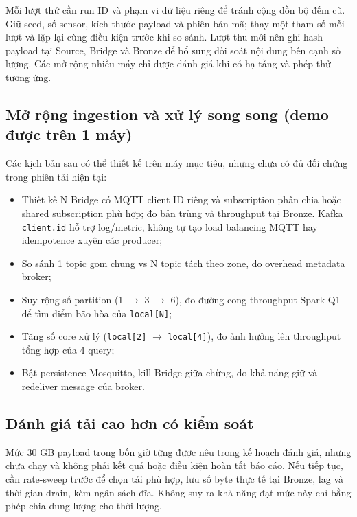 Mỗi lượt thử cần run ID và phạm vi dữ liệu riêng để tránh cộng dồn bộ
đếm cũ. Giữ seed, số sensor, kích thước payload và phiên bản mã; thay một
tham số mỗi lượt và lặp lại cùng điều kiện trước khi so sánh. Lượt thu
mới nên ghi hash payload tại Source, Bridge và Bronze để bổ sung đối
soát nội dung bên cạnh số lượng. Các mở rộng nhiều máy chỉ được đánh
giá khi có hạ tầng và phép thử tương ứng.

\subsection{Mở rộng ingestion và xử lý song song (demo được trên 1 máy)}

Các kịch bản sau có thể thiết kế trên máy mục tiêu, nhưng chưa có đủ
đối chứng trong phiên tải hiện tại:

\begin{itemize}
  \item Thiết kế N Bridge có MQTT client ID riêng và subscription phân chia
        hoặc shared subscription phù hợp; đo bản trùng và throughput tại
        Bronze. Kafka \texttt{client.id} hỗ trợ log/metric, không tự tạo
        load balancing MQTT hay idempotence xuyên các producer;
  \item So sánh 1 topic gom chung vs N topic tách theo zone, đo overhead
        metadata broker;
  \item Suy rộng số partition (1 $\rightarrow$ 3 $\rightarrow$ 6), đo đường cong
        throughput Spark Q1 để tìm điểm bão hòa của \texttt{local[N]};
  \item Tăng số core xử lý (\texttt{local[2]} $\rightarrow$ \texttt{local[4]}),
        đo ảnh hưởng lên throughput tổng hợp của 4 query;
  \item Bật persistence Mosquitto, kill Bridge giữa chừng, đo khả năng giữ
        và redeliver message của broker.
\end{itemize}

\subsection{Đánh giá tải cao hơn có kiểm soát}
\label{sec:next-target}

Mức 30 GB payload trong bốn giờ từng được nêu trong kế hoạch đánh giá,
nhưng chưa chạy và không phải kết quả hoặc điều kiện hoàn tất báo cáo.
Nếu tiếp tục, cần rate-sweep trước để chọn tải phù hợp, lưu số byte thực
tế tại Bronze, lag và thời gian drain, kèm ngân sách đĩa. Không suy ra
khả năng đạt mức này chỉ bằng phép chia dung lượng cho thời lượng.

